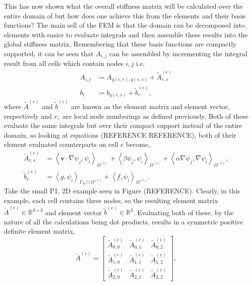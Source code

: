 This has now shown what the overall stiffness matrix will be calculated over the entire domain of but how does one achieve this from the elements and their basis functions? The main sell of the FEM is that the domain can be decomposed into elements with easier to evaluate integrals and then assemble these results into the global stiffness matrix. Remembering that these basis functions are compactly supported, it can be seen that $A_{i,j}$ can be assembled by incrementing the integral result from all cells which contain nodes $i,j$  i.e.
\begin{align}
	A_{i,j} &\coloneqq A_{q(e,r),q(e,s)} + \tilde{A}_{r,s}^{(e)}\\
	b_i &\coloneqq b_{q(e,r)} + \tilde{b}_r^{(e)},
\end{align}
where $\tilde{A}^{(e)}$ and $\tilde{b}^{(e)}$ are known as the element matrix and element vector, respectively and $r,$ are local node numberings as defined previously. Both of these evaluate the same integrals but over their compact support instead of the entire domain, so looking at equations (REFERENCE REFERENCE), both of their element evaluated counterparts on cell $e$ become,
\begin{align}
	\tilde{A}_{r,s}^{(e)} &= \left\langle\mathbf{v}\cdot\nabla \psi_j,\psi_i\right\rangle_{\Omega^{(e)}} + \left\langle\beta \psi_j,\psi_i\right\rangle_{\Omega^{(e)}} + \left\langle\alpha\nabla \psi_j, \nabla \psi_i\right\rangle_{\Omega^{(e)}}, \\
	\tilde{b}_r^{(e)} &= \left\langle g,\psi_i\right\rangle_{\Gamma_N\cap\Omega^{(e)}} + \left\langle f,\psi_i\right\rangle_{\Omega^{(e)}}.
\end{align}
Take the small P1, 2D example seen in Figure (REFERENCE). Clearly, in this example, each cell contains three nodes, so the resulting element matrix $\tilde{A}^{(e)} \in \mathbb{R}^{3\times 3}$ and element vector $\tilde{b}^{(e)} \in \mathbb{R}^3$. Evaluating both of these, by the nature of all the calculations being dot products, results in a symmetric positive definite element matrix,
\begin{equation}
	\tilde{A}^{(e)} =
	\left[\begin{matrix} 
		\tilde{A}^{(e)}_{0,0} & \tilde{A}^{(e)}_{0,1} & \tilde{A}^{(e)}_{0,2} \\
		\tilde{A}^{(e)}_{1,0} & \tilde{A}^{(e)}_{1,1} & \tilde{A}^{(e)}_{1,2} \\
		\tilde{A}^{(e)}_{2,0} & \tilde{A}^{(e)}_{2,1} & \tilde{A}^{(e)}_{2,2}
	\end{matrix}\right],
\end{equation}

